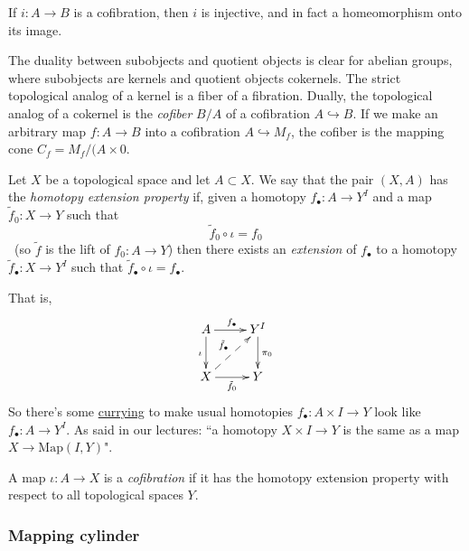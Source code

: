 \begin{proposition}[4H.1]
\label{proposition-4h-1}
	If $i:A\to B$ is a cofibration, then $i$ is
	injective, and in fact a homeomorphism onto
	its image.
\end{proposition}

\begin{remark}
\label{remark-from-hatcher-p-461}
The duality between subobjects and quotient
objects is clear for abelian groups,
where subobjects are kernels and quotient
objects cokernels. The strict
topological analog of a kernel is a fiber of
a fibration. Dually, the
topological analog of a cokernel is the {\it
cofiber} $B/A$ of a
cofibration $A\hookrightarrow B$. If we make
an arbitrary map  $f:A\to B$ into a
cofibration $A\hookrightarrow M_{f}$, the
cofiber is the mapping cone
$C_{f}=M_{f}/(A\times {0}$.
\end{remark}

\begin{definition}
\label{definition-https-en-wikip-org-wiki}
	Let $X$ be a topological space and let
	$A\subset X$. We say that the pair $(X,A)$
	has the {\it homotopy extension property}
	if, given a homotopy $f_\bullet:A\to Y^I$
	and a map $\tilde{f}_0:X\to Y$ such that
		$$\tilde{f}_0\circ\iota=f_0$$\
		(so $\tilde{f}$ is the lift of $f_0:A\to
		Y$) then there exists an {\it extension} of
		$f_\bullet$ to a homotopy
		$\tilde{f}_\bullet:X\to Y^I$ such that
		$\tilde{f}_\bullet\circ\iota=f_\bullet$.

		That is,
		$$
		\xymatrix{
			A\ar[r]^{f_\bullet}\ar[d]_{\iota}
			&Y^I\ar[d]^{\pi_0}\\
			X\ar@{-->}[ur]^{\tilde{f}_\bullet}
			\ar[r]_{\tilde{f}_0}&Y
		}
		$$
		So there's some
		\href{https://en.wikipedia.org/wiki/%
		Currying#Function_spaces}{currying}
		to make usual homotopies $f_\bullet:A\times
		I\to Y$ look like $f_\bullet:A\to Y^I$. As
		said in our lectures: ``a homotopy $X\times
		I\to Y$ is the same as a map $X\to
		\text{Map}(I,Y)$".

	A map $\iota:A\to X$ is a {\it cofibration}
	if it has the homotopy extension property
	with respect to all topological spaces  $Y$.
\end{definition}

\subsubsection{Mapping cylinder}
\label{subsection-mapping-cylinder}

